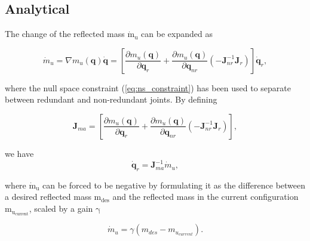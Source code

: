 




















\label{subsec:2Dminim}




\subsection{Analytical}
\label{sec:analytical}

The change of the reflected mass $\mathrm{{\dot{m}_u}}$ can be expanded as

\begin{equation}
{\dot{m}_u}=\nabla m_u(\mathbf{q}) \dot{\mathbf{q}} = \left[ \frac{\partial {m_u(\mathbf{q})}}{\partial{\mathbf{q}_{r}}} + \frac{\partial {m_u(\mathbf{q})}}{\partial{\mathbf{q}_{nr}}}  (- \mathbf{J}_{nr}^{-1} \mathbf{J}_r) \right ]  \mathbf{\dot{q}}_r ,
\label{eq:mass_expanded}
\end{equation}

where the null space constraint (\ref{eq:ns_constraint}) has been used to separate between redundant and non-redundant joints. By defining

\begin{equation}
\mathbf{J}_{ma} = \left[ \frac{\partial {m_u(\mathbf{q})}}{\partial{\mathbf{q}_{r}}} + \frac{\partial {m_u(\mathbf{q})}}{\partial{\mathbf{q}_{nr}}}  (- \mathbf{J}_{nr}^{-1} \mathbf{J}_r) \right ] ,
\label{eq:jma}
\end{equation}

we have 
\begin{equation}
\mathbf{\dot{q}}_r = \mathbf{J}_{ma}^{-1} {\dot{m}_u},
\label{eq:qr_jma}
\end{equation}

where ${\mathrm{\dot{m}_u}}$ can be forced  to be negative by formulating it as the difference between a desired reflected mass $\mathrm{m_{des}}$ and the reflected mass in the current configuration $\mathrm{m_{u_{current}}}$, scaled by a gain $\mathrm{\gamma}$


\begin{equation}
{\dot{m}_u} =  \gamma (m_{des} - m_{u_{current}}).
\label{eq:m_dot_analytical_1}
\end{equation}

